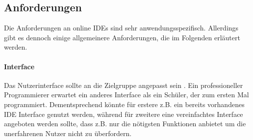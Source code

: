 \subsection{Anforderungen}\label{section:stand-der-technik:literaturrecherche:anforderungen}

Die Anforderungen an online IDEs sind sehr anwendungsspezifisch. Allerdings gibt es dennoch einige allgemeinere Anforderungen, die im Folgenden erläutert werden.


\paragraph{Interface}
Das Nutzerinterface sollte an die Zielgruppe angepasst sein \cite{malan_standardizing_2022}. Ein professioneller Programmierer erwartet ein anderes Interface als ein Schüler, der zum ersten Mal programmiert. Dementsprechend könnte für erstere z.B. ein bereits vorhandenes IDE Interface genutzt werden, während für zweitere eine vereinfachtes Interface angeboten werden sollte, dass z.B. nur die nötigsten Funktionen anbietet um die unerfahrenen Nutzer nicht zu überfordern.

